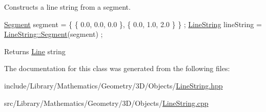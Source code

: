 Constructs a line string from a segment. 


\begin{DoxyCode}
\hyperlink{classlibrary_1_1math_1_1geom_1_1d3_1_1objects_1_1_line_string_a7fb1bcb80907e72aa55f0692ed2517f1}{Segment} segment = \{ \{ 0.0, 0.0, 0.0 \}, \{ 0.0, 1.0, 2.0 \} \} ;
\hyperlink{classlibrary_1_1math_1_1geom_1_1d3_1_1objects_1_1_line_string_aab80e60f34f06d4ab9f84f0e59aa389e}{LineString} lineString = \hyperlink{classlibrary_1_1math_1_1geom_1_1d3_1_1objects_1_1_line_string_a7fb1bcb80907e72aa55f0692ed2517f1}{LineString::Segment}(segment) ;
\end{DoxyCode}


\begin{DoxyReturn}{Returns}
\hyperlink{classlibrary_1_1math_1_1geom_1_1d3_1_1objects_1_1_line}{Line} string 
\end{DoxyReturn}


The documentation for this class was generated from the following files\+:\begin{DoxyCompactItemize}
\item 
include/\+Library/\+Mathematics/\+Geometry/3\+D/\+Objects/\hyperlink{3_d_2_objects_2_line_string_8hpp}{Line\+String.\+hpp}\item 
src/\+Library/\+Mathematics/\+Geometry/3\+D/\+Objects/\hyperlink{3_d_2_objects_2_line_string_8cpp}{Line\+String.\+cpp}\end{DoxyCompactItemize}
